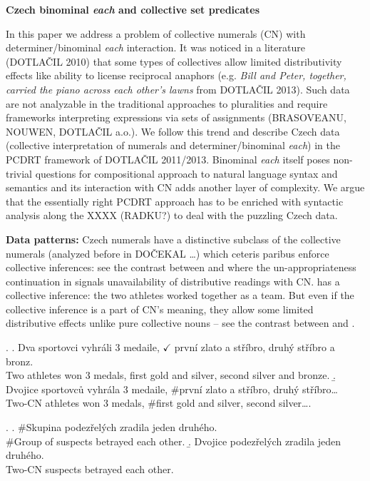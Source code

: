 \documentclass[12pt, a4paper]{scrartcl}
\begin{document}
\begin{center}
\textbf{Czech binominal \textit{each} and collective set predicates}
\end{center}

In this paper we address a problem of collective numerals (CN) with determiner/binominal \textit{each} interaction. It was noticed in a literature (DOTLAČIL 2010) that some types of collectives allow limited distributivity effects like ability to license reciprocal anaphors (e.g. \textit{Bill and Peter, together, carried the piano across each other's lawns} from DOTLAČIL 2013). Such data are not analyzable in the traditional approaches to pluralities and require frameworks interpreting expressions via sets of assignments (BRASOVEANU, NOUWEN, DOTLAČIL a.o.). We follow this trend and describe Czech data (collective interpretation of numerals and determiner/binominal \textit{each}) in the PCDRT framework of DOTLAČIL 2011/2013. Binominal \textit{each} itself poses non-trivial questions for compositional approach to natural language syntax and semantics and its interaction with CN adds another layer of complexity. We argue that the essentially right PCDRT approach has to be enriched with syntactic analysis along the XXXX (RADKU?) to deal with the puzzling Czech data.

\textbf{Data patterns:} Czech numerals have a distinctive subclass of the collective numerals (analyzed before in DOČEKAL \ldots) which ceteris paribus enforce collective inferences: see the contrast between \Next[a] and \Next[b] where the un-appropriateness continuation in \Next[b] signals unavailability of distributive readings with CN. \Next[b] has a collective inference: the two athletes worked together as a team. But even if the collective inference is a part of CN's meaning, they allow some limited distributive effects unlike pure collective nouns -- see the contrast between \NNext[a] and \NNext[b].

\ex. \a. Dva sportovci vyhráli 3 medaile, $\checkmark$ první zlato a stříbro, druhý stříbro a bronz.\\
Two athletes won 3 medals, first gold and silver, second silver and bronze.
\b. Dvojice sportovců vyhrála 3 medaile, \#první zlato a stříbro, druhý stříbro\ldots\\
Two-CN athletes won 3 medals, \#first gold and silver, second silver\ldots.

\ex. \a. \#Skupina podezřelých zradila jeden druhého.\\
\#Group of suspects betrayed each other.
\b. Dvojice podezřelých zradila jeden druhého.\\
Two-CN suspects betrayed each other.
\end{document}

